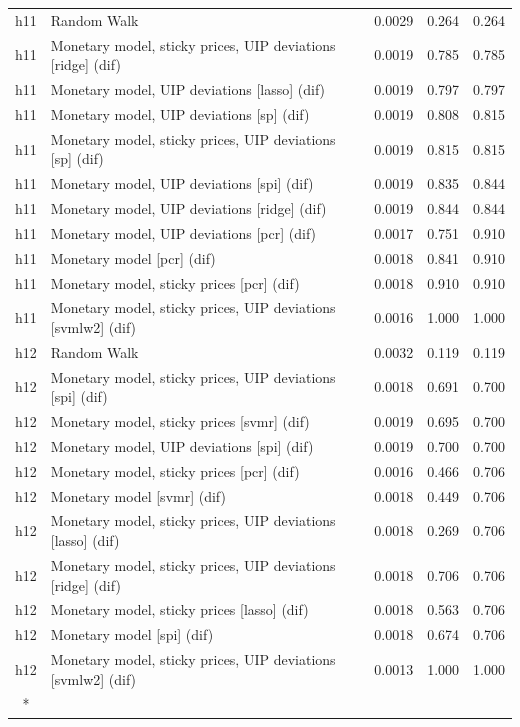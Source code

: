 \begin{ThreePartTable}
\begin{longtable}[t]{cp{5.5cm}ccc}
\addlinespace
h11 & \raggedright Random Walk & 0.0029 & 0.264 & 0.264\\
h11 & \raggedright Monetary model, sticky prices, UIP deviations [ridge] (dif) & 0.0019 & 0.785 & 0.785\\
h11 & \raggedright Monetary model, UIP deviations [lasso] (dif) & 0.0019 & 0.797 & 0.797\\
h11 & \raggedright Monetary model, UIP deviations [sp] (dif) & 0.0019 & 0.808 & 0.815\\
h11 & \raggedright Monetary model, sticky prices, UIP deviations [sp] (dif) & 0.0019 & 0.815 & 0.815\\
h11 & \raggedright Monetary model, UIP deviations [spi] (dif) & 0.0019 & 0.835 & 0.844\\
h11 & \raggedright Monetary model, UIP deviations [ridge] (dif) & 0.0019 & 0.844 & 0.844\\
h11 & \raggedright Monetary model, UIP deviations [pcr] (dif) & 0.0017 & 0.751 & 0.910\\
h11 & \raggedright Monetary model [pcr] (dif) & 0.0018 & 0.841 & 0.910\\
h11 & \raggedright Monetary model, sticky prices [pcr] (dif) & 0.0018 & 0.910 & 0.910\\
h11 & \raggedright Monetary model, sticky prices, UIP deviations [svmlw2] (dif) & 0.0016 & 1.000 & 1.000\\
\addlinespace
h12 & \raggedright Random Walk & 0.0032 & 0.119 & 0.119\\
h12 & \raggedright Monetary model, sticky prices, UIP deviations [spi] (dif) & 0.0018 & 0.691 & 0.700\\
h12 & \raggedright Monetary model, sticky prices [svmr] (dif) & 0.0019 & 0.695 & 0.700\\
h12 & \raggedright Monetary model, UIP deviations [spi] (dif) & 0.0019 & 0.700 & 0.700\\
h12 & \raggedright Monetary model, sticky prices [pcr] (dif) & 0.0016 & 0.466 & 0.706\\
h12 & \raggedright Monetary model [svmr] (dif) & 0.0018 & 0.449 & 0.706\\
h12 & \raggedright Monetary model, sticky prices, UIP deviations [lasso] (dif) & 0.0018 & 0.269 & 0.706\\
h12 & \raggedright Monetary model, sticky prices, UIP deviations [ridge] (dif) & 0.0018 & 0.706 & 0.706\\
h12 & \raggedright Monetary model, sticky prices [lasso] (dif) & 0.0018 & 0.563 & 0.706\\
h12 & \raggedright Monetary model [spi] (dif) & 0.0018 & 0.674 & 0.706\\
h12 & \raggedright Monetary model, sticky prices, UIP deviations [svmlw2] (dif) & 0.0013 & 1.000 & 1.000\\*
\end{longtable}
\end{ThreePartTable}
\endgroup{}
